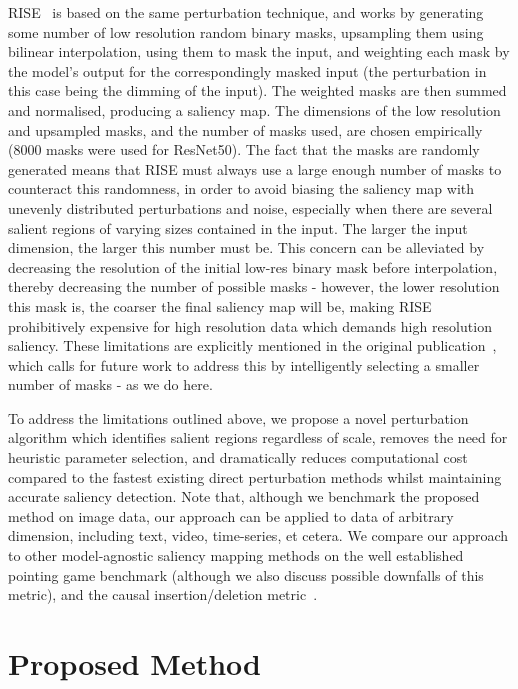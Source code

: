 \documentclass{article} %
\begin{document}
RISE~\cite{Petsiuk2018-wx} is based on the same perturbation technique, and works by generating some number of low resolution random binary masks, upsampling them using bilinear interpolation, using them to mask the input, and weighting each mask by the model's output for the correspondingly masked input (the perturbation in this case being the dimming of the input). The weighted masks are then summed and normalised, producing a saliency map. The dimensions of the low resolution and upsampled masks, and the number of masks used, are chosen empirically (8000 masks were used for ResNet50). The fact that the masks are randomly generated means that RISE must always use a large enough number of masks to counteract this randomness, in order to avoid biasing the saliency map with unevenly distributed perturbations and noise, especially when there are several salient regions of varying sizes contained in the input. The larger the input dimension, the larger this number must be. This concern can be alleviated by decreasing the resolution of the initial low-res binary mask before interpolation, thereby decreasing the number of possible masks - however, the lower resolution this mask is, the coarser the final saliency map will be, making RISE prohibitively expensive for high resolution data which demands high resolution saliency. These limitations are explicitly mentioned in the original  publication~\cite{Petsiuk2018-wx}, which calls for future work to address this by intelligently selecting a smaller number of masks - as we do here.

To address the limitations outlined above, we propose a novel perturbation algorithm which identifies salient regions regardless of scale, removes the need for heuristic parameter selection, and dramatically reduces computational cost compared to the fastest existing direct perturbation methods whilst maintaining accurate saliency detection. Note that, although we benchmark the proposed method on image data, our approach can be applied to data of arbitrary dimension, including text, video, time-series, et cetera. We compare our approach to other model-agnostic saliency mapping methods on the well established pointing game benchmark (although we also discuss possible downfalls of this metric), and the causal insertion/deletion metric~\cite{Zeiler2013-lm}.

\section{Proposed Method}
\end{document}

